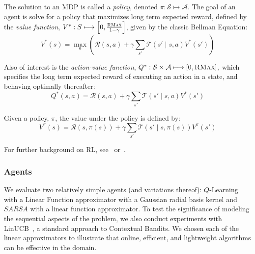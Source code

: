 \documentclass{article}
\newcommand{\mc}{\mathcal}
\begin{document}
{The solution to an MDP is called a {\it policy}, denoted $\pi : \mc{S} \longmapsto \mc{A}$. The goal of an agent is solve for a policy that maximizes long term expected reward, defined by the {\it value function}, $V^* : S \longmapsto \left[0,\frac{\textsc{RMax}}{1-\gamma}\right]$, given by the classic Bellman Equation:
\begin{equation}
V^*(s) = \max_a \left(\mc{R}(s,a) + \gamma \sum_{s'} \mc{T}(s' \mid s, a) V^*(s') \right)
\end{equation}

Also of interest is the {\it action-value function}, $Q^*: \mc{S} \times \mc{A} \longmapsto [0,\textsc{RMax}]$, which specifies the long term expected reward of executing an action in a state, and behaving optimally thereafter:
\begin{equation}
Q^*(s,a) = \mc{R}(s,a) + \gamma \sum_{s'} \mc{T}(s' \mid s,a) V^*(s')
\end{equation}

Given a policy, $\pi$, the value under the policy is defined by:
\begin{equation}
V^\pi(s) = \mc{R}(s, \pi(s)) + \gamma \sum_{s'} \mc{T}(s' \mid s, \pi(s)) V^\pi(s')
\end{equation}

For further background on RL, see~\citet{sutton1998reinforcement} or~\citet{kaelbling1996reinforcement}.

\subsubsection{Agents}
We evaluate two relatively simple agents (and variations thereof): $Q$-Learning with a Linear Function approximator with a Gaussian radial basis kernel and $SARSA$ with a linear function approximator. To test the significance of modeling the sequential aspects of the problem, we also conduct experiments with LinUCB~\cite{li2010contextual}, a standard approach to Contextual Bandits. We chosen each of the linear approximators to illustrate that online, efficient, and lightweight algorithms can be effective in the domain.

}
\end{document}
